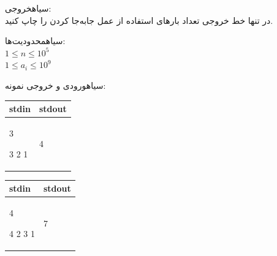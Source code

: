 ‌سیاه{خروجی:}\\
در تنها خط خروجی تعداد بارهای استفاده از عمل جابه‌جا کردن را چاپ کنید.



‌سیاه{محدودیت‌ها:}\\
$1\leq n\leq 10^5$\\
$1\leq a_i\leq 10^9$


‌سیاه{ورودی و خروجی نمونه:}\\


\begin{latin}
\begin{tabularx}{\textwidth}{|X | X|}
\hline
\textbf{stdin} &
\textbf{stdout}\\
\hline
3

3 2 1&
4\\
\hline

\end{tabularx}
\end{latin}


\begin{latin}
\begin{tabularx}{\textwidth}{|X | X|}
\hline
\textbf{stdin} &
\textbf{stdout}\\
\hline
4

4 2 3 1&
7\\
\hline

\end{tabularx}
\end{latin}










